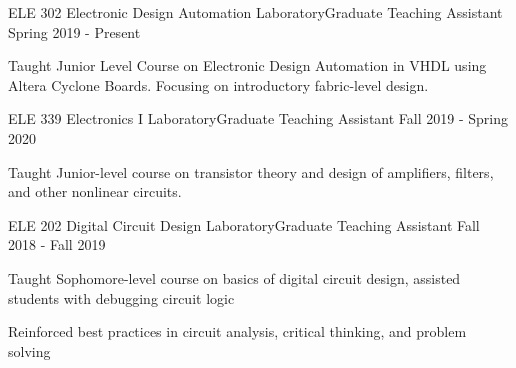 \gradheader
\begin{cvprojectentries}
  {ELE 302 {\cdotp} Electronic Design Automation Laboratory}{Graduate Teaching Assistant}
  {Spring 2019 - Present}
  {
    \begin{cvitems}
    \item{Taught Junior Level Course on Electronic Design Automation in VHDL using Altera Cyclone Boards. Focusing on introductory fabric-level design.}
    \end{cvitems}
  }
  {ELE 339 {\cdotp} Electronics I Laboratory}{Graduate Teaching Assistant}
  {Fall 2019 - Spring 2020}
  {
    \begin{cvitems}
    \item{Taught Junior-level course on transistor theory and design of amplifiers, filters, and other nonlinear circuits.}
    \end{cvitems}
  }
  {ELE 202 {\cdotp} Digital Circuit Design Laboratory}{Graduate Teaching Assistant}
  {Fall 2018 - Fall 2019}
  {
    \begin{cvitems}
        \item{Taught Sophomore-level course on basics of digital circuit design, assisted students with debugging circuit logic}
        \item{Reinforced best practices in circuit analysis, critical thinking, and problem solving}
    \end{cvitems}
  }
\end{cvprojectentries}
